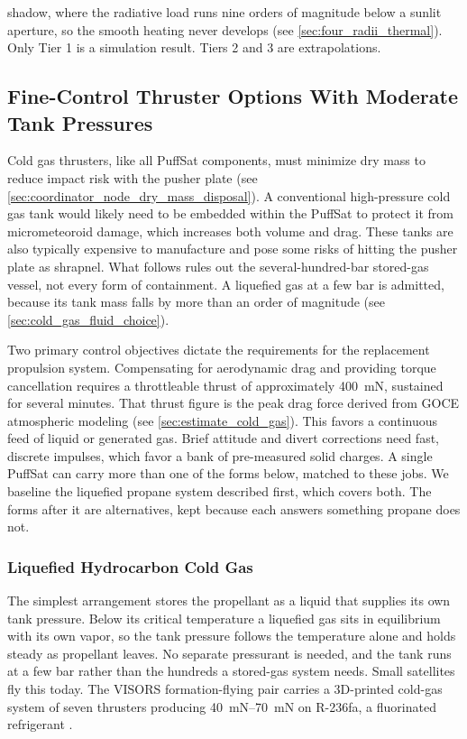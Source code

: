 \documentclass{article}
\begin{document}
shadow, where the radiative load runs nine orders of magnitude below a sunlit aperture, so the smooth heating never develops (see \autoref{sec:four_radii_thermal}). Only Tier 1 is a simulation result. Tiers 2 and 3 are extrapolations.

\subsection{Fine-Control Thruster Options With Moderate Tank Pressures}\label{sec:fine_control_thrusters}
Cold gas thrusters, like all PuffSat components, must minimize dry mass to reduce impact risk with the pusher plate (see \autoref{sec:coordinator_node_dry_mass_disposal}). A conventional high-pressure cold gas tank would likely need to be embedded within the PuffSat to protect it from micrometeoroid damage, which increases both volume and drag. These tanks are also typically expensive to manufacture and pose some risks of hitting the pusher plate as shrapnel. What follows rules out the several-hundred-bar stored-gas vessel, not every form of containment. A liquefied gas at a few bar is admitted, because its tank mass falls by more than an order of magnitude (see \autoref{sec:cold_gas_fluid_choice}).

Two primary control objectives dictate the requirements for the replacement propulsion system. Compensating for aerodynamic drag and providing torque cancellation requires a throttleable thrust of approximately \SI{400}{\milli\newton}, sustained for several minutes. That thrust figure is the peak drag force derived from GOCE atmospheric modeling (see \autoref{sec:estimate_cold_gas}). This favors a continuous feed of liquid or generated gas. Brief attitude and divert corrections need fast, discrete impulses, which favor a bank of pre-measured solid charges. A single PuffSat can carry more than one of the forms below, matched to these jobs. We baseline the liquefied propane system described first, which covers both. The forms after it are alternatives, kept because each answers something propane does not.

\subsubsection{Liquefied Hydrocarbon Cold Gas}\label{sec:cold_gas_fluid_choice}
The simplest arrangement stores the propellant as a liquid that supplies its own tank pressure. Below its critical temperature a liquefied gas sits in equilibrium with its own vapor, so the tank pressure follows the temperature alone and holds steady as propellant leaves. No separate pressurant is needed, and the tank runs at a few bar rather than the hundreds a stored-gas system needs. Small satellites fly this today. The VISORS formation-flying pair carries a 3D-printed cold-gas system of seven thrusters producing \SIrange{40}{70}{\milli\newton} on R-236fa, a fluorinated refrigerant \cite{hart2022visors_propulsion}. 
\end{document}

